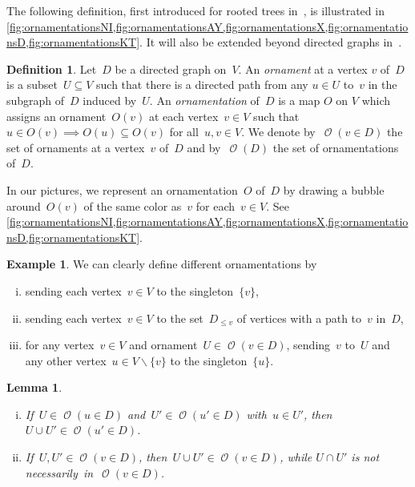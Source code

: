 \documentclass{amsart}
\newtheorem{lemma}[theorem]{Lemma}
\theoremstyle{definition}
\newtheorem{definition}[theorem]{Definition}
\newtheorem{example}[theorem]{Example}
\renewcommand{\c}[1]{\mathcal{#1}} %
\newcommand{\ssm}{\smallsetminus} %
\newcommand{\darkblue}{\color{darkblue}} %
\newcommand{\defn}[1]{\textsl{\darkblue #1}} %
\newcommand{\lessin}[2]{#1_{\le#2}} %
\DeclareMathOperator{\Orn}{\c{O}}  %
\begin{document}
The following definition, first introduced for rooted trees in~\cite{DefantSack}, is illustrated in \cref{fig:ornamentationsNI,fig:ornamentationsAY,fig:ornamentationsX,fig:ornamentationsD,fig:ornamentationsKT}.
It will also be extended beyond directed graphs in~\cite{Sack}.

\begin{definition}
\label{def:Orn}
Let~$D$ be a directed graph on~$V$.
An \defn{ornament} at a vertex $v$ of~$D$ is a subset~$U \subseteq V$ such that there is a directed path from any $u \in U$ to~$v$ in the subgraph of~$D$ induced by~$U$.
An \defn{ornamentation} of~$D$ is a map $O$ on $V$ which assigns an ornament~$O(v)$ at each vertex~$v \in V$ such that~$u \in O(v) \implies O(u) \subseteq O(v)$ for all~$u,v \in V$.
We denote by~$\Orn(v \in D)$ the set of ornaments at a vertex~$v$ of~$D$ and by~$\Orn(D)$ the set of ornamentations of~$D$.
\end{definition}

In our pictures, we represent an ornamentation~$O$ of~$D$ by drawing a bubble around~$O(v)$ of the same color as~$v$ for each~$v \in V$.
See \cref{fig:ornamentationsNI,fig:ornamentationsAY,fig:ornamentationsX,fig:ornamentationsD,fig:ornamentationsKT}.

\begin{example}
\label{exm:ornamentations}
We can clearly define different ornamentations by
\begin{enumerate}[(i)]
\item sending each vertex~$v \in V$ to the singleton~$\{v\}$, 
\item sending each vertex~$v \in V$ to the set~$\lessin{D}{v}$ of vertices with a path to~$v$ in~$D$,
\item for any vertex~$v \in V$ and ornament~$U \in \Orn(v \in D)$, sending~$v$ to~$U$ and any other vertex~${u \in V \ssm \{v\}}$ to the singleton~$\{u\}$.
\end{enumerate}
\end{example}

\begin{lemma}
\label{lem:unionOrnaments}
\begin{enumerate}[(i)]
\item If~$U \in \Orn(u \in D)$ and~$U' \in \Orn(u' \in D)$ with~$u \in U'$, then~${U \cup U' \in \Orn(u' \in D)}$.
\item If~$U,U' \in \Orn(v \in D)$, then~$U \cup U' \in \Orn(v \in D)$, while $U \cap U'$ is not necessarily~in~${\Orn(v \in D)}$.
\end{enumerate}
\end{lemma}
\end{document}
